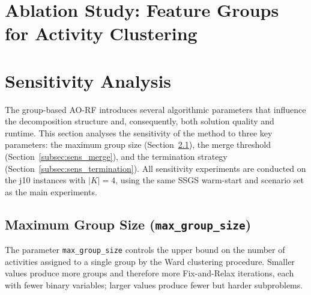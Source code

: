 \section{Ablation Study: Feature Groups for Activity Clustering}
\label{sec:ablation}




\section{Sensitivity Analysis}
\label{sec:sensitivity}

The group-based AO-RF introduces several algorithmic parameters
that influence the decomposition structure and, consequently,
both solution quality and runtime. This section analyses the
sensitivity of the method to three key parameters:
the maximum group size
(Section~\ref{subsec:sens_group_size}),
the merge threshold
(Section~\ref{subsec:sens_merge}),
and the termination strategy
(Section~\ref{subsec:sens_termination}).
All sensitivity experiments are conducted on the j10 instances
with $|K|=4$, using the same SSGS warm-start and scenario set
as the main experiments.

\subsection{Maximum Group Size
            (\texttt{max\_group\_size})}
\label{subsec:sens_group_size}



The parameter \texttt{max\_group\_size} controls the upper
bound on the number of activities assigned to a single group
by the Ward clustering procedure. Smaller values produce more
groups and therefore more Fix-and-Relax iterations, each with
fewer binary variables; larger values produce fewer but harder
subproblems.

